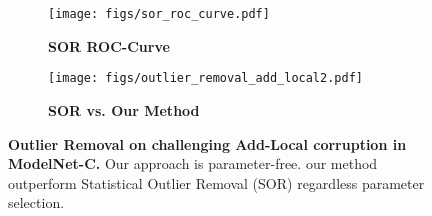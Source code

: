 \documentclass[10pt,twocolumn,letterpaper]{article}
\begin{document}
\begin{figure*}[ptbh!]
    \centering
    \captionsetup[subfigure]{justification=centering}
    \begin{subfigure}[t]{0.45\textwidth} \texttt{[image: figs/sor\_roc\_curve.pdf]}
\caption{{\bf SOR ROC-Curve} }    
        \label{subfig:sor_roc_curve}
    \end{subfigure}
    \begin{subfigure}[t]{0.45\textwidth} \texttt{[image: figs/outlier\_removal\_add\_local2.pdf]}
\caption{{\bf SOR vs. Our Method}}
        \label{subfig:outlier_removal_add_local}
    \end{subfigure}
    \caption{\textbf{Outlier Removal on challenging Add-Local corruption in ModelNet-C.} Our approach is parameter-free. our method outperform Statistical Outlier Removal (SOR) regardless parameter selection.
    }
    \label{fig:outlier_removal}
\end{figure*}
\end{document}
